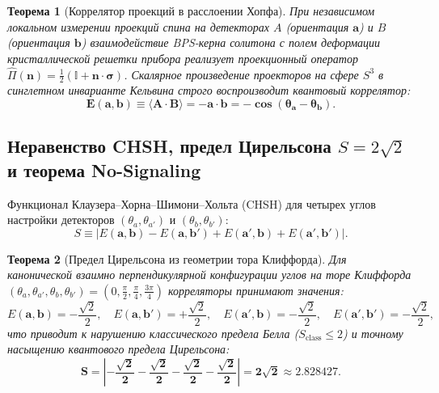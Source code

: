 \documentclass[11pt,a4paper,oneside]{article}
\theoremstyle{plain}
\newtheorem{theorem}{Теорема}[section]
\theoremstyle{definition}
\theoremstyle{remark}
\numberwithin{equation}{section}
\begin{document}
\begin{theorem}[Коррелятор проекций в расслоении Хопфа]
	При независимом локальном измерении проекций спина на детекторах $A$ (ориентация $\mathbf{a}$) и $B$ (ориентация $\mathbf{b}$) взаимодействие BPS-керна солитона с полем деформации кристаллической решетки прибора реализует проекционный оператор $\hat{\Pi}(\mathbf{n}) = \frac{1}{2}(\mathbb{I} + \mathbf{n}\cdot\boldsymbol{\sigma})$.
	Скалярное произведение проекторов на сфере $S^3$ в синглетном инварианте Кельвина строго воспроизводит квантовый коррелятор:
	\begin{equation}
		\mathbf{E(\mathbf{a}, \mathbf{b}) \equiv \langle A \cdot B \rangle = -\mathbf{a} \cdot \mathbf{b} = -\cos(\theta_a - \theta_b)}.
		\label{eq:quantum_correlator_exact}
	\end{equation}
\end{theorem}

\subsection{Неравенство CHSH, предел Цирельсона $S = 2\sqrt{2}$ и теорема No-Signaling}

Функционал Клаузера--Хорна--Шимони--Хольта (CHSH) для четырех углов настройки детекторов $(\theta_a, \theta_{a'})$ и $(\theta_b, \theta_{b'})$:
\begin{equation}
S \equiv \left| E(\mathbf{a}, \mathbf{b}) - E(\mathbf{a}, \mathbf{b}') + E(\mathbf{a}', \mathbf{b}) + E(\mathbf{a}', \mathbf{b}') \right|.
\end{equation}

\begin{theorem}[Предел Цирельсона из геометрии тора Клиффорда]
Для канонической взаимно перпендикулярной конфигурации углов на торе Клиффорда $(\theta_a, \theta_{a'}, \theta_b, \theta_{b'}) = (0, \frac{\pi}{2}, \frac{\pi}{4}, \frac{3\pi}{4})$ корреляторы принимают значения:
\begin{equation}
	E(\mathbf{a}, \mathbf{b}) = -\frac{\sqrt{2}}{2}, \quad E(\mathbf{a}, \mathbf{b}') = +\frac{\sqrt{2}}{2}, \quad E(\mathbf{a}', \mathbf{b}) = -\frac{\sqrt{2}}{2}, \quad E(\mathbf{a}', \mathbf{b}') = -\frac{\sqrt{2}}{2},
\end{equation}
что приводит к нарушению классического предела Белла ($S_{\text{class}} \le 2$) и точному насыщению квантового предела Цирельсона:
\begin{equation}
	\mathbf{S = \left| -\frac{\sqrt{2}}{2} - \frac{\sqrt{2}}{2} - \frac{\sqrt{2}}{2} - \frac{\sqrt{2}}{2} \right| = \mathbf{2\sqrt{2} \approx 2.828427}}.
	\label{eq:tsirelson_bound}
\end{equation}
\end{theorem}
\end{document}
